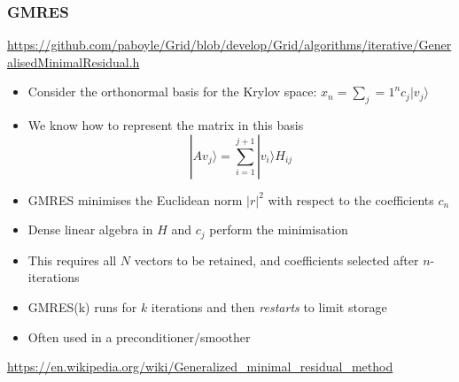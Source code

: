 \documentclass[pdf,ps,8pt]{beamer}
\newcommand{\link}[1]{\href{#1}{ {\color{blue} #1} }}
\begin{document}
  \begin{frame}[fragile]\small\frametitle{ GMRES}

    \link{https://github.com/paboyle/Grid/blob/develop/Grid/algorithms/iterative/GeneralisedMinimalResidual.h}
    
    \begin{itemize}
    \item Consider the orthonormal basis for the Krylov space: $x_n = \sum\limits_j=1^n c_j | v_j\rangle $
    \item We know how to represent the matrix in this basis
    $$
        | A v_j \rangle =  \sum\limits_{i=1}^{j+1}  | v_i \rangle H_{ij}
    $$
      \item GMRES minimises the Euclidean norm $|r|^2$ with respect to the coefficients $c_n$
      \item Dense linear algebra in $H$ and $c_j$ perform the minimisation
      \item This requires all $N$ vectors to be retained, and coefficients selected after $n$-iterations
    \item GMRES(k) runs for $k$ iterations and then \emph{restarts} to limit storage
    \item Often used in a preconditioner/smoother
    \end{itemize}

    \href{https://en.wikipedia.org/wiki/Generalized_minimal_residual_method}{{\color{blue}https://en.wikipedia.org/wiki/Generalized\_minimal\_residual\_method}}

    
  \end{frame}
\end{document}
